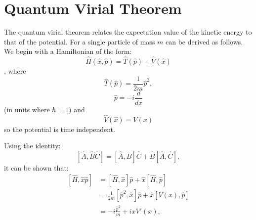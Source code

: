 \documentclass[12pt]{article}
\begin{document}
    \section{Quantum Virial Theorem}
        \label{ap:Quantum Virial Theorem}
        The quantum virial theorem relates the expectation value of the kinetic energy to that of the potential. For a single particle of mass $m$ can be derived as follows. We begin with a Hamiltonian of the form:
        \begin{equation}
            \label{eq:VirialHamiltonian}
            \hat{H}\left(\hat{x},\hat{p}\right) = \hat{T}\left(\hat{p}\right)+\hat{V}\left(\hat{x}\right)  
        \end{equation},
        where
        \begin{equation}
            \label{eq:VirialKinetic}
            \hat{T}\left(\hat{p}\right) = \frac{1}{2m}\hat{p}^2,
        \end{equation}
        \begin{equation}
            \label{eq:VirialMomentumOperator}
            \hat{p} = -i\frac{d}{dx}
        \end{equation}
        (in units where $\hbar=1$) and
        \begin{equation}
            \label{eq:VirialPotentialOperator} \hat{V}\left(\hat{x}\right) = V\left(x\right)
        \end{equation}
        so the potential is time independent.

        Using the identity:
        \begin{equation}
            \label{eq:CommutatorABC}
            \left[\hat{A},\hat{B}\hat{C}\right] = \left[\hat{A},\hat{B}\right]\hat{C}+\hat{B}\left[\hat{A},\hat{C}\right],
        \end{equation}
        it can be shown that:
        \begin{align}
            \label{eq:VirialHCommutator1} \left[\hat{H},\hat{x}\hat{p}\right] & = \left[\hat{H},\hat{x}\right]\hat{p} + \hat{x}\left[\hat{H},\hat{p}\right] \\
            \label{eq:VirialHCommutator2} & = \frac{1}{2m}\left[\hat{p}^2,\hat{x}\right]\hat{p}+\hat{x}\left[V\left(x\right),\hat{p}\right] \\
            \label{eq:VirialHCommutator2} & = -i\frac{\hat{p}^2}{m} + ixV'\left(x\right),
        \end{align}
\end{document}
